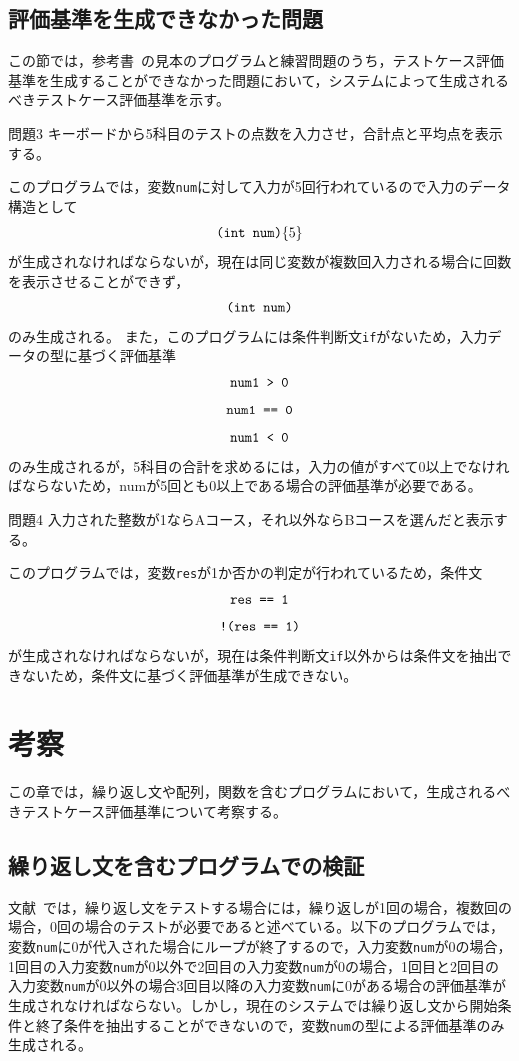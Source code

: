 \documentclass{tpu-sotu}
\begin{document}
\section{評価基準を生成できなかった問題}
この節では，参考書~\cite{b1}の見本のプログラムと練習問題のうち，テストケース評価基準を生成することができなかった問題において，システムによって生成されるべきテストケース評価基準を示す。
\begin{itembox}[l]{問題3}
キーボードから5科目のテストの点数を入力させ，合計点と平均点を表示する。
\end{itembox}

このプログラムでは，変数{\tt num}に対して入力が5回行われているので入力のデータ構造として
\[
\mbox{{\tt (int num)}\{5\}}
\]
が生成されなければならないが，現在は同じ変数が複数回入力される場合に回数を表示させることができず，
\[
\mbox{{\tt (int num)}}
\]
のみ生成される。
また，このプログラムには条件判断文{\tt if}がないため，入力データの型に基づく評価基準\\
\[ 
\mbox{\tt{num1 > 0}} 
\]
\[
\mbox{\tt{num1 == 0}}
\]
\[
\mbox{\tt{num1 < 0}}
\]
のみ生成されるが，5科目の合計を求めるには，入力の値がすべて0以上でなければならないため，numが5回とも0以上である場合の評価基準が必要である。
\begin{itembox}[l]{問題4}
入力された整数が1ならAコース，それ以外ならBコースを選んだと表示する。
\end{itembox}

このプログラムでは，変数{\tt res}が1か否かの判定が行われているため，条件文
\[
\mbox{\tt{res == 1}}
\]
\[
\mbox{\tt{!(res == 1)}}
\]
が生成されなければならないが，現在は条件判断文{\tt if}以外からは条件文を抽出できないため，条件文に基づく評価基準が生成できない。

\chapter{考察}
この章では，繰り返し文や配列，関数を含むプログラムにおいて，生成されるべきテストケース評価基準について考察する。
\section{繰り返し文を含むプログラムでの検証}
文献~\cite{b2}では，繰り返し文をテストする場合には，繰り返しが1回の場合，複数回の場合，0回の場合のテストが必要であると述べている。以下のプログラムでは，変数{\tt num}に0が代入された場合にループが終了するので，入力変数{\tt num}が0の場合，1回目の入力変数{\tt num}が0以外で2回目の入力変数{\tt num}が0の場合，1回目と2回目の入力変数{\tt num}が0以外の場合3回目以降の入力変数{\tt num}に0がある場合の評価基準が生成されなければならない。しかし，現在のシステムでは繰り返し文から開始条件と終了条件を抽出することができないので，変数{\tt num}の型による評価基準のみ生成される。

\end{document}
